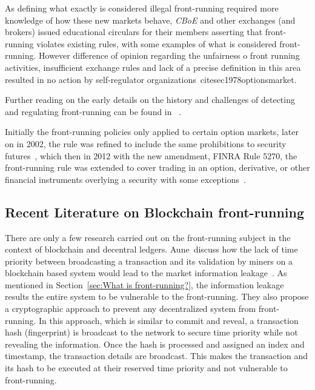 As defining what exactly is considered illegal front-running required more knowledge of how these new markets behave, \textit{CBoE} and other exchanges (and brokers) issued educational circulars for their members asserting that front-running violates existing rules, with some examples of what is considered front-running. However difference of opinion regarding the unfairness o front running activities, insufficient exchange rules and lack of a precise definition in this area resulted in no action by self-regulator organizations~cite{sec1978optionsmarket}. 

Further reading on the early details on the history and challenges of detecting and regulating front-running can be found in~\cite{markham1988front} . %

Initially the front-running policies only applied to certain option markets, later on in 2002, the rule was refined to include the same prohibitions to security futures~\cite{finra_2002}, which then in 2012 with the new amendment, FINRA Rule 5270, the front-running rule was extended to cover trading in an option, derivative, or other financial instruments overlying a security with some exceptions~\cite{sec2012frontrunning, finra_2012}. 


\subsection{Recent Literature on Blockchain front-running}
There are only a few research carried out on the front-running subject in the context of blockchain and decentral ledgers. 
Aune~\etal discuss how the lack of time priority between broadcasting a transaction and its validation by miners on a blockchain based system would lead to the market information leakage~\cite{aune2017footprints}. As mentioned in Section~\ref{sec:What is front-running?}, the information leakage results the entire system to be vulnerable to the front-running. They also propose a cryptographic approach to prevent any decentralized system from front-running. In this approach, which is similar to commit and reveal, a transaction hash (fingerprint) is broadcast to the network to secure time priority while not revealing the information. Once the hash is processed and assigned an index and timestamp, the transaction details are broadcast. This makes the transaction and its hash to be executed at their reserved time priority and not vulnerable to front-running.

